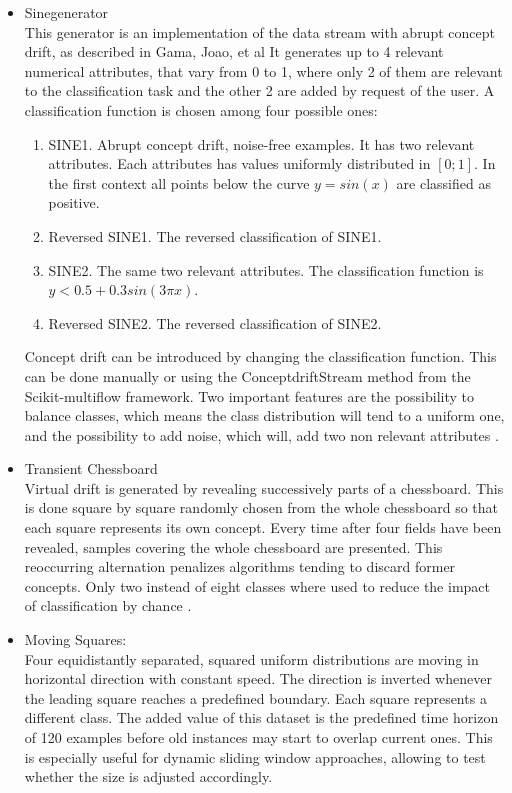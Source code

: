\documentclass[12pt,oneside,a4paper,parskip]{scrbook}
\begin{document}
\begin{itemize}
  \item Sinegenerator\\
        This generator is an implementation of the data stream with abrupt concept drift, as described in Gama, Joao, et al \cite{sinegenerator}
        It generates up to 4 relevant numerical attributes, that vary from 0 to 1, where only 2 of them are relevant to 
        the classification task and the other 2 are added by request of the user. A classification function is chosen 
        among four possible ones: 
        \begin{enumerate}
          \item SINE1. Abrupt concept drift, noise-free examples. It has two relevant attributes. Each attributes has 
          values uniformly distributed in $[0;1]$. In the first context all points below the curve $y=sin(x)$ are classified as positive.
          \item Reversed SINE1. The reversed classification of SINE1.
          \item SINE2. The same two relevant attributes. The classification function is $y<0.5+0.3sin(3\pi x)$.
          \item Reversed SINE2. The reversed classification of SINE2.
        \end{enumerate}

        Concept drift can be introduced by changing the classification function. This can be done manually or using the ConceptdriftStream method
        from the Scikit-multiflow framework.
        Two important features are the possibility to balance classes, which means the class distribution will tend to a uniform one, and the 
        possibility to add noise, which will, add two non relevant attributes \cite{skmultiflow}.
    
  \item Transient Chessboard\\
        Virtual drift is generated by revealing successively parts of a chessboard. This is done square by square 
        randomly chosen from the whole chessboard so that each square represents its own concept. Every time after four 
        fields have been revealed, samples covering the whole chessboard are presented. This reoccurring alternation 
        penalizes algorithms tending to discard former concepts. Only two instead of eight classes where used to reduce
        the impact of classification by chance \cite{movingsquaresChessboardRialtobridge}.


  \item Moving Squares: \\
        Four equidistantly separated, squared uniform distributions are moving in horizontal direction with constant 
        speed. The direction is inverted whenever the leading square reaches a predefined boundary. Each square 
        represents a different class. The added value of this dataset is the predefined time horizon of 120 examples 
        before old instances may start to overlap current ones. This is especially useful for dynamic sliding window 
        approaches, allowing to test whether the size is adjusted accordingly. \cite{movingsquaresChessboardRialtobridge}
        


\end{itemize}
\end{document}
